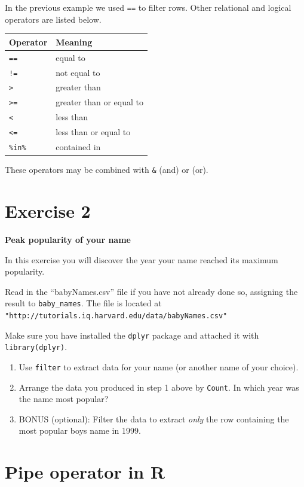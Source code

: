 \documentclass[]{book}
\begin{document}
In the previous example we used \texttt{==} to filter rows. Other
relational and logical operators are listed below.

\begin{longtable}[]{@{}ll@{}}
\toprule
Operator & Meaning\tabularnewline
\midrule
\endhead
\texttt{==} & equal to\tabularnewline
\texttt{!=} & not equal to\tabularnewline
\texttt{\textgreater{}} & greater than\tabularnewline
\texttt{\textgreater{}=} & greater than or equal to\tabularnewline
\texttt{\textless{}} & less than\tabularnewline
\texttt{\textless{}=} & less than or equal to\tabularnewline
\texttt{\%in\%} & contained in\tabularnewline
\bottomrule
\end{longtable}

These operators may be combined with \texttt{\&} (and) or
\texttt{\textbar{}} (or).

\section{Exercise 2}\label{exercise-2}

\textbf{Peak popularity of your name}

In this exercise you will discover the year your name reached its
maximum popularity.

Read in the ``babyNames.csv'' file if you have not already done so,
assigning the result to \texttt{baby\_names}. The file is located at
\texttt{"http://tutorials.iq.harvard.edu/data/babyNames.csv"}

Make sure you have installed the \texttt{dplyr} package and attached it
with \texttt{library(dplyr)}.

\begin{enumerate}
\def\labelenumi{\arabic{enumi}.}
\item
  Use \texttt{filter} to extract data for your name (or another name of
  your choice).
\item
  Arrange the data you produced in step 1 above by \texttt{Count}. In
  which year was the name most popular?
\item
  BONUS (optional): Filter the data to extract \emph{only} the row
  containing the most popular boys name in 1999.
\end{enumerate}

\section{Pipe operator in R}\label{pipe-operator-in-r}
\end{document}
